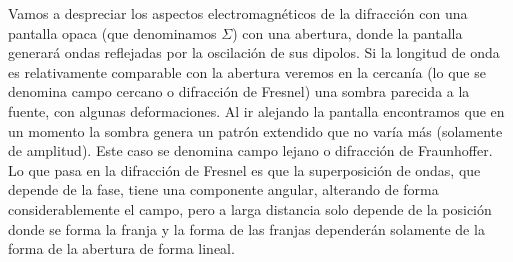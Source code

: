 \documentclass[a4paper]{article}
\numberwithin{equation}{section}
\begin{document}
	Vamos a despreciar los aspectos electromagnéticos de la difracción con una pantalla opaca (que denominamos $\Sigma$) con una abertura, donde la pantalla generará ondas reflejadas por la oscilación de sus dipolos. Si la longitud de onda es relativamente comparable con la abertura veremos en la cercanía (lo que se denomina campo cercano o difracción de Fresnel) una sombra parecida a la fuente, con algunas deformaciones. Al ir alejando la pantalla encontramos que en un momento la sombra genera un patrón extendido que no varía más (solamente de amplitud). Este caso se denomina campo lejano o difracción de Fraunhoffer. Lo que pasa en la difracción de Fresnel es que la superposición de ondas, que depende de la fase, tiene una componente angular, alterando de forma considerablemente el campo, pero a larga distancia solo depende de la posición donde se forma la franja y la forma de las franjas dependerán solamente de la forma de la abertura de forma lineal.
	
\end{document}
